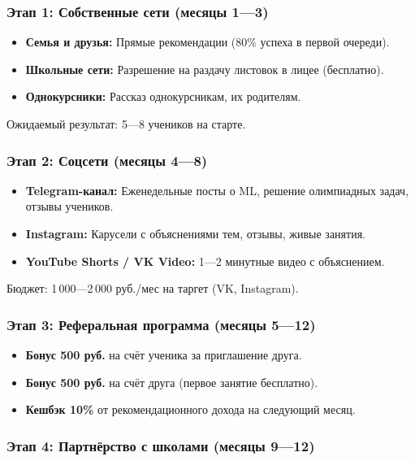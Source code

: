 \documentclass[12pt,a4paper]{article}
\begin{document}
\subsubsection{Этап 1: Собственные сети (месяцы 1---3)}

\begin{itemize}
  \item \textbf{Семья и друзья:} Прямые рекомендации (80\% успеха в первой очереди).
  \item \textbf{Школьные сети:} Разрешение на раздачу листовок в лицее (бесплатно).
  \item \textbf{Однокурсники:} Рассказ однокурсникам, их родителям.
\end{itemize}

Ожидаемый результат: 5---8 учеников на старте.

\subsubsection{Этап 2: Соцсети (месяцы 4---8)}

\begin{itemize}
  \item \textbf{Telegram-канал:} Еженедельные посты о ML, решение олимпиадных задач, отзывы учеников.
  \item \textbf{Instagram:} Карусели с объяснениями тем, отзывы, живые занятия.
  \item \textbf{YouTube Shorts / VK Video:} 1---2 минутные видео с объяснением.
\end{itemize}

Бюджет: 1\,000---2\,000 руб./мес на таргет (VK, Instagram).

\subsubsection{Этап 3: Реферальная программа (месяцы 5---12)}

\begin{itemize}
  \item \textbf{Бонус 500 руб.} на счёт ученика за приглашение друга.
  \item \textbf{Бонус 500 руб.} на счёт друга (первое занятие бесплатно).
  \item \textbf{Кешбэк 10\%} от рекомендационного дохода на следующий месяц.
\end{itemize}

\subsubsection{Этап 4: Партнёрство с школами (месяцы 9---12)}
\end{document}
